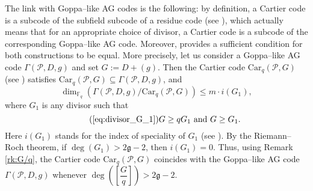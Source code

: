 \documentclass[lettersize,journal]{IEEEtran}
\theoremstyle{plain}
\theoremstyle{definition}
\theoremstyle{remark}
\newcommand{\calP}{\mathcal{P}}
\newcommand{\fq}{\mathbb{F}_{q}}
\begin{document}
	The link with Goppa--like AG codes is the following: by definition, a Cartier code is a subcode of the subfield subcode of a residue code (see \cite[Proposition 4.3]{Cou14}), which actually means that for an appropriate choice of divisor, a Cartier code is a subcode of the corresponding Goppa--like AG code. Moreover, \cite[Theorem 5.1]{Cou14} provides a sufficient condition for both constructions to be equal. More precisely, let us consider a Goppa--like AG code $\Gamma(\calP,D,g)$  and set $G := D+(g)$. Then the Cartier code $\mathrm{Car}_q(\calP,G)$ (see \cite[Definition 4.2]{Cou14}) satisfies $\mathrm{Car}_q(\calP,G) \subseteq \Gamma(\calP,D,g)$, and 
	$$ \dim_{\fq} \left( \Gamma(\calP,D,g)/ \mathrm{Car}_q(\calP,G)\right) \leq m \cdot i(G_1),$$
	where $G_1$ is any divisor such that 
	\begin{equation} \tag{\ref{eq:divisor_G_1}}
		G \geq qG_1 \ \mathrm{and} \ G \geq G_1.
	\end{equation}
	Here $i(G_1)$ stands for the index of speciality of $G_1$ (see \cite[Definition~1.6.10]{Sti09}). By the Riemann--Roch theorem, if $\deg(G_1) > 2\mathfrak{g}-2$, then $i(G_1) =0.$ 
	Thus, using Remark \ref{rk:G/q}, the Cartier code $\mathrm{Car}_q(\calP,G)$ coincides with the Goppa--like AG code $\Gamma(\calP,D,g)$ whenever $\deg\left(\left[\dfrac{G}{q} \right]\right) > 2\mathfrak{g}-2$. 
	
\end{document}

